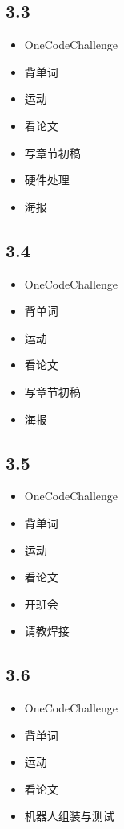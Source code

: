 \documentclass[UTF8]{ctexart}
\begin{document}
\subsection*{3.3}
\begin{itemize}
    \item OneCodeChallenge
    \item 背单词
    \item 运动
    \item 看论文
    \item 写章节初稿
    \item 硬件处理
    \item 海报
\end{itemize}

\subsection*{3.4}
\begin{itemize}
    \item OneCodeChallenge
    \item 背单词
    \item 运动
    \item 看论文
    \item 写章节初稿
    \item 海报
\end{itemize}

\subsection*{3.5}
\begin{itemize}
    \item OneCodeChallenge
    \item 背单词
    \item 运动
    \item 看论文
    \item 开班会
    \item 请教焊接
\end{itemize}

\subsection*{3.6}
\begin{itemize}
    \item OneCodeChallenge
    \item 背单词
    \item 运动
    \item 看论文
    \item 机器人组装与测试
\end{itemize}
\end{document}
